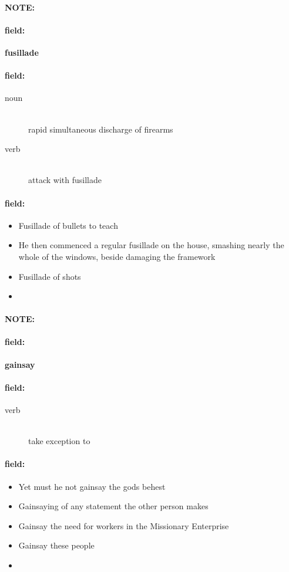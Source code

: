 \documentclass[12pt]{article}
\newenvironment{note}{\paragraph{NOTE:}}{}
\newenvironment{field}{\paragraph{field:}}{}
\begin{document}
\begin{note}
\begin{field}
\textbf{\large fusillade}
\end{field}


\begin{field}
\begin{description}
\item[noun] \hfill \\ 
rapid simultaneous discharge of firearms

\item[verb] \hfill \\ 
attack with fusillade

\end{description}
\end{field}

\begin{field}
\begin{itemize}
\item Fusillade of bullets to teach
\item He then commenced a regular fusillade on the house, smashing nearly the whole of the windows, beside damaging the framework
\item Fusillade of shots
\item 
\end{itemize}
\end{field}
\end{note}
\begin{note}
\begin{field}
\textbf{\large gainsay}
\end{field}


\begin{field}
\begin{description}
\item[verb] \hfill \\ 
take exception to

\end{description}
\end{field}

\begin{field}
\begin{itemize}
\item Yet must he not gainsay the gods behest
\item Gainsaying of any statement the other person makes
\item Gainsay the need for workers in the Missionary Enterprise
\item Gainsay these people
\item 
\end{itemize}
\end{field}
\end{note}
\end{document}
